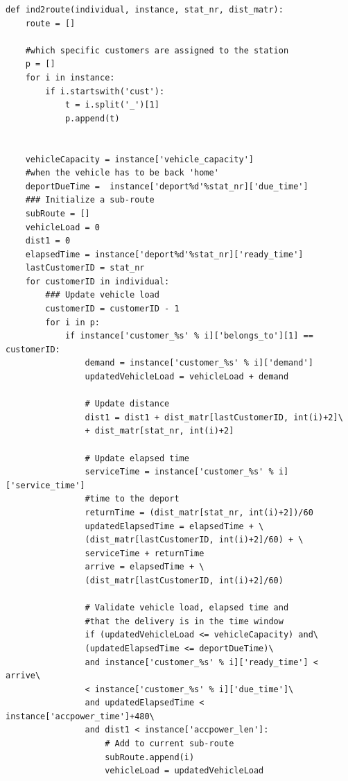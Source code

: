 \documentclass[a4paper,12pt,parskip,bibtotoc,liststotoc]{article}
\begin{document}
\begin{appendix}
\begin{lstlisting}
def ind2route(individual, instance, stat_nr, dist_matr):
    route = []
    
    #which specific customers are assigned to the station
    p = []
    for i in instance:
        if i.startswith('cust'):
            t = i.split('_')[1]
            p.append(t)
            
            
    vehicleCapacity = instance['vehicle_capacity']
    #when the vehicle has to be back 'home'
    deportDueTime =  instance['deport%d'%stat_nr]['due_time']   
    ### Initialize a sub-route
    subRoute = []
    vehicleLoad = 0
    dist1 = 0
    elapsedTime = instance['deport%d'%stat_nr]['ready_time']
    lastCustomerID = stat_nr
    for customerID in individual:
        ### Update vehicle load
        customerID = customerID - 1
        for i in p:
            if instance['customer_%s' % i]['belongs_to'][1] == customerID:
                demand = instance['customer_%s' % i]['demand']
                updatedVehicleLoad = vehicleLoad + demand
                
                # Update distance
                dist1 = dist1 + dist_matr[lastCustomerID, int(i)+2]\
                + dist_matr[stat_nr, int(i)+2]
                
                # Update elapsed time
                serviceTime = instance['customer_%s' % i]['service_time']
                #time to the deport
                returnTime = (dist_matr[stat_nr, int(i)+2])/60    
                updatedElapsedTime = elapsedTime + \
                (dist_matr[lastCustomerID, int(i)+2]/60) + \
                serviceTime + returnTime 
                arrive = elapsedTime + \
                (dist_matr[lastCustomerID, int(i)+2]/60)
                
                # Validate vehicle load, elapsed time and
                #that the delivery is in the time window
                if (updatedVehicleLoad <= vehicleCapacity) and\
                (updatedElapsedTime <= deportDueTime)\
                and instance['customer_%s' % i]['ready_time'] < arrive\
                < instance['customer_%s' % i]['due_time']\
                and updatedElapsedTime < instance['accpower_time']+480\
                and dist1 < instance['accpower_len']:
                    # Add to current sub-route
                    subRoute.append(i)
                    vehicleLoad = updatedVehicleLoad
                

\end{lstlisting}
\end{appendix}
\end{document}
